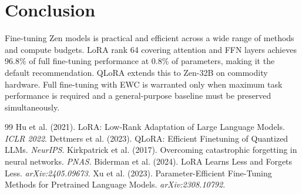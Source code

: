 \documentclass[11pt,a4paper]{article}
\begin{document}
\section{Conclusion}

Fine-tuning Zen models is practical and efficient across a wide range of methods
and compute budgets. LoRA rank 64 covering attention and FFN layers achieves
96.8\% of full fine-tuning performance at 0.8\% of parameters, making it the
default recommendation. QLoRA extends this to Zen-32B on commodity hardware.
Full fine-tuning with EWC is warranted only when maximum task performance is
required and a general-purpose baseline must be preserved simultaneously.


\begin{thebibliography}{99}
 Hu et al. (2021). LoRA: Low-Rank Adaptation of Large Language Models. \textit{ICLR 2022}.
 Dettmers et al. (2023). QLoRA: Efficient Finetuning of Quantized LLMs. \textit{NeurIPS}.
 Kirkpatrick et al. (2017). Overcoming catastrophic forgetting in neural networks. \textit{PNAS}.
 Biderman et al. (2024). LoRA Learns Less and Forgets Less. \textit{arXiv:2405.09673}.
 Xu et al. (2023). Parameter-Efficient Fine-Tuning Methods for Pretrained Language Models. \textit{arXiv:2308.10792}.
\end{thebibliography}
\end{document}
